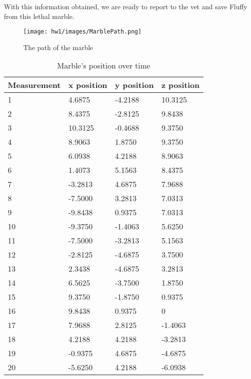 \documentclass[a4paper,12 pt]{article}
\begin{document}
With this information obtained, we are ready to report to the vet and save Fluffy from this lethal marble.
 
\vspace{10mm}
\begin{figure}[H]
  \centering
    \texttt{[image: hw1/images/MarblePath.png]}
    \label{fig:example}
\caption{The path of the marble}
\end{figure}

\begin{table}[H]
\centering
\begin{tabular}{|l|l|l|l|}
\hline
Measurement & x position & y position & z position \\ \hline
1          & 4.6875  & -4.2188 & 10.3125 \\ \hline
2          & 8.4375  & -2.8125 & 9.8438  \\ \hline
3          & 10.3125 & -0.4688 & 9.3750  \\ \hline
4          & 8.9063  & 1.8750  & 9.3750  \\ \hline
5          & 6.0938  & 4.2188  & 8.9063  \\ \hline
6          & 1.4073  & 5.1563  & 8.4375  \\ \hline
7          & -3.2813 & 4.6875  & 7.9688  \\ \hline
8          & -7.5000 & 3.2813  & 7.0313  \\ \hline
9          & -9.8438 & 0.9375  & 7.0313  \\ \hline
10         & -9.3750 & -1.4063 & 5.6250  \\ \hline
11         & -7.5000 & -3.2813 & 5.1563  \\ \hline
12         & -2.8125 & -4.6875 & 3.7500  \\ \hline
13         & 2.3438  & -4.6875 & 3.2813  \\ \hline
14         & 6.5625  & -3.7500 & 1.8750  \\ \hline
15         & 9.3750  & -1.8750 & 0.9375  \\ \hline
16         & 9.8438  & 0.9375  & 0       \\ \hline
17         & 7.9688  & 2.8125  & -1.4063 \\ \hline
18         & 4.2188  & 4.2188  & -3.2813 \\ \hline
19         & -0.9375 & 4.6875  & -4.6875 \\ \hline
20         & -5.6250 & 4.2188  & -6.0938 \\ \hline
\end{tabular}
\caption{Marble's position over time}
\end{table}
\end{document}
